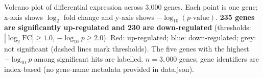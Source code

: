 \caption{Volcano plot of differential expression across 3{,}000 genes.
Each point is one gene; x-axis shows $\log_2$ fold change and y-axis shows
$-\log_{10}(p\text{-value})$.
\textbf{235 genes are significantly up-regulated and 230 are down-regulated}
(thresholds: $|\log_2\text{FC}| \geq 1.0$, $-\log_{10}p \geq 2.0$).
Red: up-regulated; blue: down-regulated; grey: not significant (dashed lines
mark thresholds).
The five genes with the highest $-\log_{10}p$ among significant hits are
labelled.
$n = 3{,}000$ genes; gene identifiers are index-based (no gene-name metadata
provided in data.json).}
